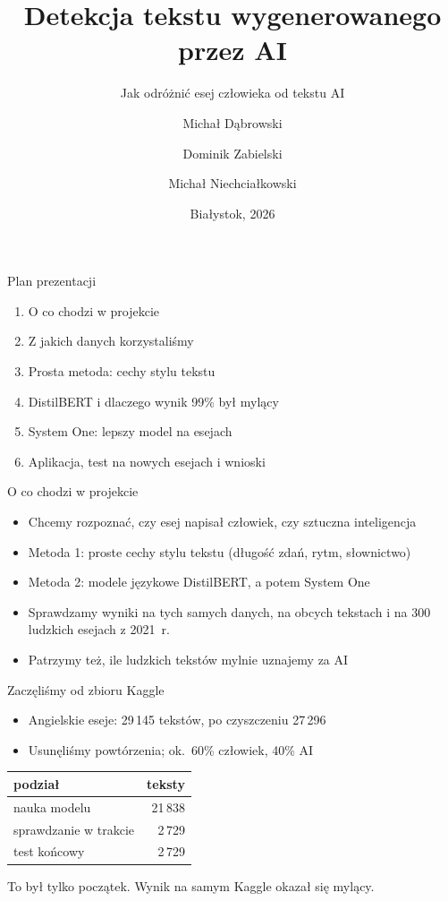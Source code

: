 \documentclass[aspectratio=169,11pt]{beamer}
\title{Detekcja tekstu wygenerowanego przez AI}
\subtitle{Jak odróżnić esej człowieka od tekstu AI}
\author{Michał Dąbrowski \and Dominik Zabielski \and Michał Niechciałkowski}
\institute{Politechnika Białostocka, Wydział Informatyki\\
Prowadzący: dr hab.\ inż.\ Sławomir Zieliński}
\date{Białystok, 2026}
\begin{document}
\begin{frame}
  \titlepage
\end{frame}

\begin{frame}{Plan prezentacji}
  \begin{enumerate}
    \item O co chodzi w projekcie
    \item Z jakich danych korzystaliśmy
    \item Prosta metoda: cechy stylu tekstu
    \item DistilBERT i dlaczego wynik 99\% był mylący
    \item System One: lepszy model na esejach
    \item Aplikacja, test na nowych esejach i wnioski
  \end{enumerate}
\end{frame}

\begin{frame}{O co chodzi w projekcie}
  \begin{itemize}
    \item Chcemy rozpoznać, czy esej napisał człowiek, czy sztuczna inteligencja
    \item Metoda 1: proste cechy stylu tekstu (długość zdań, rytm, słownictwo)
    \item Metoda 2: modele językowe DistilBERT, a potem System One
    \item Sprawdzamy wyniki na tych samych danych, na obcych tekstach
          i na 300 ludzkich esejach z 2021~r.
    \item Patrzymy też, ile ludzkich tekstów mylnie uznajemy za AI
  \end{itemize}
\end{frame}

\begin{frame}{Zaczęliśmy od zbioru Kaggle}
  \begin{itemize}
    \item Angielskie eseje: 29\,145 tekstów, po czyszczeniu 27\,296
    \item Usunęliśmy powtórzenia; ok.\ 60\% człowiek, 40\% AI
  \end{itemize}

  \vspace{0.6em}
  \begin{center}
  \begin{tabular}{lr}
    \toprule
    podział & teksty \\
    \midrule
    nauka modelu & 21\,838 \\
    sprawdzanie w trakcie & 2\,729 \\
    test końcowy & 2\,729 \\
    \bottomrule
  \end{tabular}
  \end{center}

  \vspace{0.8em}
  \alert{To był tylko początek.} Wynik na samym Kaggle okazał się mylący.
\end{frame}
\end{document}
